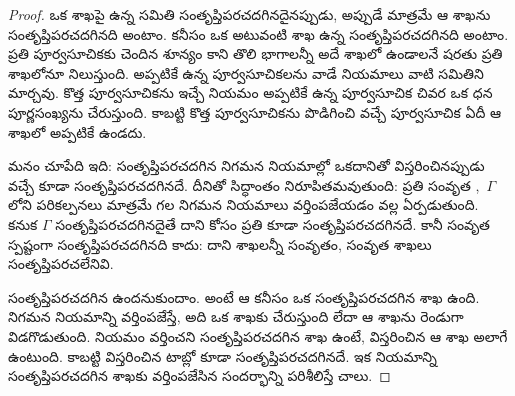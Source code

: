 \documentclass[../../../include/open-logic-section]{subfiles}
\begin{document}
\begin{proof}
ఒక  శాఖపై ఉన్న
 సమితి
సంతృప్తిపరచదగినదైనప్పుడు, అప్పుడే మాత్రమే ఆ శాఖను సంతృప్తిపరచదగినది అంటాం.
కనీసం ఒక అటువంటి శాఖ ఉన్న 
సంతృప్తిపరచదగినది అంటాం.
ప్రతి పూర్వసూచికకు చెందిన శూన్యం కాని తొలి భాగాలన్నీ అదే
శాఖలో ఉండాలనే షరతు ప్రతి శాఖలోనూ నిలుస్తుంది. అప్పటికే ఉన్న
పూర్వసూచికలను వాడే నియమాలు వాటి సమితిని మార్చవు.
కొత్త పూర్వసూచికను ఇచ్చే నియమం అప్పటికే ఉన్న పూర్వసూచిక
చివర ఒక ధన పూర్ణసంఖ్యను చేరుస్తుంది. కాబట్టి కొత్త పూర్వసూచికను
పొడిగించి వచ్చే పూర్వసూచిక ఏదీ ఆ శాఖలో అప్పటికే ఉండదు.

మనం చూపేది ఇది: సంతృప్తిపరచదగిన 
నిగమన నియమాల్లో ఒకదానితో విస్తరించినప్పుడు వచ్చే
 కూడా సంతృప్తిపరచదగినదే.
దీనితో సిద్ధాంతం నిరూపితమవుతుంది: ప్రతి సంవృత
,~$\Gamma$లోని పరికల్పనలు మాత్రమే
గల  నిగమన నియమాలు వర్తింపజేయడం
వల్ల ఏర్పడుతుంది. కనుక $\Gamma$ సంతృప్తిపరచదగినదైతే
దాని కోసం ప్రతి  కూడా
సంతృప్తిపరచదగినదే. కానీ సంవృత 
స్పష్టంగా సంతృప్తిపరచదగినది కాదు: దాని శాఖలన్నీ
సంవృతం, సంవృత శాఖలు సంతృప్తిపరచలేనివి.

సంతృప్తిపరచదగిన  ఉందనుకుందాం.
అంటే ఆ  కనీసం ఒక
సంతృప్తిపరచదగిన శాఖ ఉంది. నిగమన నియమాన్ని వర్తింపజేస్తే,
అది ఒక శాఖకు 
చేరుస్తుంది లేదా ఆ శాఖను రెండుగా విడగొడుతుంది. నియమం
వర్తించని సంతృప్తిపరచదగిన శాఖ  ఉంటే,
విస్తరించిన  ఆ శాఖ అలాగే ఉంటుంది.
కాబట్టి విస్తరించిన టాబ్లో కూడా సంతృప్తిపరచదగినదే. ఇక
నియమాన్ని సంతృప్తిపరచదగిన శాఖకు వర్తింపజేసిన సందర్భాన్ని
పరిశీలిస్తే చాలు.


\end{proof}
\end{document}
